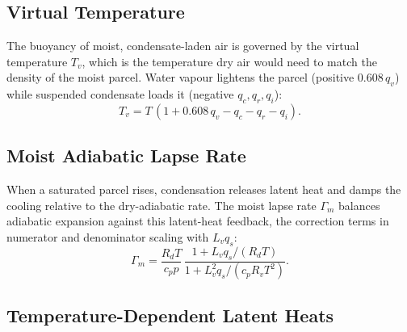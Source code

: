 \documentclass[11pt,twoside]{report}
\newcommand{\Rd}{R_d}
\newcommand{\cpd}{c_p}
\newcommand{\Lv}{L_v}
\newcommand{\Rv}{R_v}
\begin{document}
\subsection{Virtual Temperature}

The buoyancy of moist, condensate-laden air is governed by the virtual
temperature $T_v$, which is the temperature dry air would need to match the
density of the moist parcel. Water vapour lightens the parcel (positive
$0.608\,q_v$) while suspended condensate loads it (negative $q_c,q_r,q_i$):
\begin{equation}
  T_v = T\,(1 + 0.608\,q_v - q_c - q_r - q_i).
\end{equation}

\subsection{Moist Adiabatic Lapse Rate}

When a saturated parcel rises, condensation releases latent heat and damps
the cooling relative to the dry-adiabatic rate. The moist lapse rate
$\Gamma_m$ balances adiabatic expansion against this latent-heat feedback,
the correction terms in numerator and denominator scaling with $\Lv q_s$:
\begin{equation}
  \Gamma_m = \frac{\Rd T}{\cpd p}\,
  \frac{1+\Lv q_s/(\Rd T)}{1+\Lv^2 q_s/(\cpd\Rv T^2)}.
\end{equation}

\subsection{Temperature-Dependent Latent Heats}
\label{sec:latent-heat}
\end{document}
